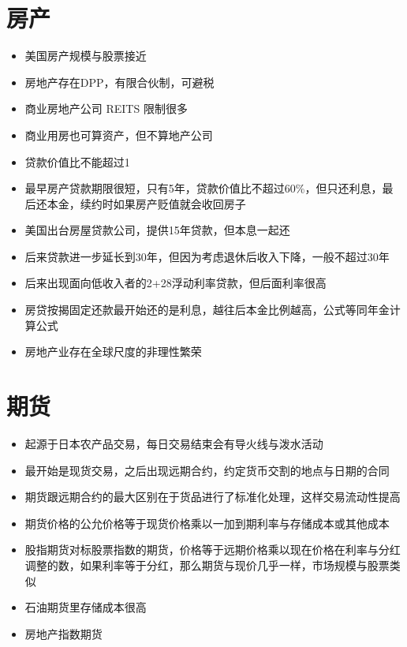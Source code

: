 \documentclass[]{book}
\providecommand{\tightlist}{%
  \setlength{\itemsep}{0pt}\setlength{\parskip}{0pt}}
\begin{document}
\hypertarget{ux623fux4ea7}{%
\section{房产}\label{ux623fux4ea7}}

\begin{itemize}
\tightlist
\item
  美国房产规模与股票接近
\item
  房地产存在DPP，有限合伙制，可避税
\item
  商业房地产公司 REITS 限制很多
\item
  商业用房也可算资产，但不算地产公司
\item
  贷款价值比不能超过1
\item
  最早房产贷款期限很短，只有5年，贷款价值比不超过60\%，但只还利息，最后还本金，续约时如果房产贬值就会收回房子
\item
  美国出台房屋贷款公司，提供15年贷款，但本息一起还
\item
  后来贷款进一步延长到30年，但因为考虑退休后收入下降，一般不超过30年
\item
  后来出现面向低收入者的2+28浮动利率贷款，但后面利率很高
\item
  房贷按揭固定还款最开始还的是利息，越往后本金比例越高，公式等同年金计算公式
\item
  房地产业存在全球尺度的非理性繁荣
\end{itemize}

\hypertarget{ux671fux8d27}{%
\section{期货}\label{ux671fux8d27}}

\begin{itemize}
\tightlist
\item
  起源于日本农产品交易，每日交易结束会有导火线与泼水活动
\item
  最开始是现货交易，之后出现远期合约，约定货币交割的地点与日期的合同
\item
  期货跟远期合约的最大区别在于货品进行了标准化处理，这样交易流动性提高
\item
  期货价格的公允价格等于现货价格乘以一加到期利率与存储成本或其他成本
\item
  股指期货对标股票指数的期货，价格等于远期价格乘以现在价格在利率与分红调整的数，如果利率等于分红，那么期货与现价几乎一样，市场规模与股票类似
\item
  石油期货里存储成本很高
\item
  房地产指数期货
\end{itemize}
\end{document}
